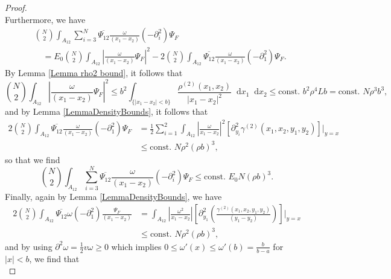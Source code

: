 \documentclass[a4paper,11pt]{article}
\newcommand{\abs}[1]{\left\lvert #1 \right\rvert}
\newcommand*\diff{\mathop{}\!\mathrm{d}}
\numberwithin{equation}{section}
\begin{document}
\begin{proof}
\begin{equation}
		\end{equation}
		Furthermore, we have \begin{equation}
		\begin{aligned}
		&\binom{N}{2}\int_{A_{12}}\sum_{i=3}^{N} \overline{\Psi_{12}}\frac{\omega}{(x_1-x_2)}(-\partial^2_i)\Psi_F\\&\quad=E_0\binom{N}{2}\int_{A_{12}}\left\lvert\frac{\omega}{(x_1-x_2)}\Psi_F\right\rvert^2-2\binom{N}{2}\int_{A_{12}} \overline{\Psi_{12}}\frac{\omega}{(x_1-x_2)}(-\partial^2_1)\Psi_F.
		\end{aligned}
		\end{equation}
		By Lemma \ref{Lemma rho2 bound}, it follows that
		\begin{equation}
		\binom{N}{2}\int_{A_{12}}\left\lvert\frac{\omega}{(x_1-x_2)}\Psi_F\right\rvert^2\leq b^2\int_{\{\abs{x_1-x_2}<b\}} \frac{\rho^{(2)}(x_1,x_2)}{\abs{x_1-x_2}^2}\diff x_1\diff x_2\leq  \text{const. } b^2\rho^4  L b=\text{const. }N\rho^3 b^3,
		\end{equation}
		and by Lemma \ref{LemmaDensityBounds}, it follows that \begin{equation}
		\begin{aligned}
		2\binom{N}{2}\int_{A_{12}} \overline{\Psi_{12}}\frac{\omega}{(x_1-x_2)}(-\partial^2_1)\Psi_F&=\frac12\sum_{i=1}^{2}\int_{A_{12}}\abs{\frac{\omega}{x_1-x_2}}^2\left[\partial^2_{y_i}\gamma^{(2)}(x_1,x_2,y_1,y_2)\right]\Big\rvert_{y=x}\\&\leq \text{const. } N\rho^2(\rho b)^3,
		\end{aligned}
		\end{equation}
		so that we find \begin{equation}
		\binom{N}{2}\int_{A_{12}}\sum_{i=3}^{N} \overline{\Psi_{12}}\frac{\omega}{(x_1-x_2)}(-\partial^2_i)\Psi_F\leq \text{const. } E_0 N(\rho b)^3.
		\end{equation}
		Finally, again by Lemma \ref{LemmaDensityBounds}, we have \begin{equation}
		\begin{aligned}
		2\binom{N}{2}\int_{A_{12}}\overline{\Psi_{12}}\omega(-\partial^2_1)\frac{\Psi_F}{(x_1-x_2)}&=\int_{A_{12}}\abs{\frac{\omega^2}{x_1-x_2}}\left[\partial^2_{y_1}\left(\frac{\gamma^{(2)}(x_1,x_2,y_1,y_2)}{(y_1-y_2)}\right)\right]\Big\rvert_{y=x}\\&\leq\text{const. }N\rho^2 (\rho b)^3,
		\end{aligned}
		\end{equation}
		and by using $ \partial^2\omega=\frac{1}{2}v\omega\geq0 $ which implies $ 0\leq\omega'(x)\leq \omega'(b)=\frac{b}{b-a} $ for $ \abs{x}<b $, we find that \begin{equation}

\end{equation}
\end{proof}
\end{document}
